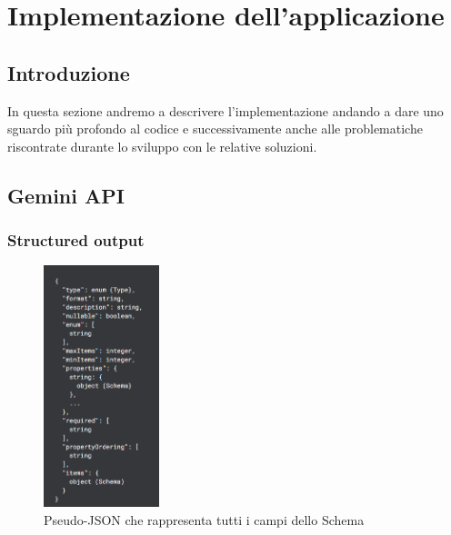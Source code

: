 \chapter{Implementazione dell'applicazione}
\pagestyle{plain}


\section{Introduzione}
In questa sezione andremo a descrivere l'implementazione andando a dare uno sguardo più profondo al codice e successivamente anche alle problematiche riscontrate durante lo sviluppo con le relative soluzioni.


\section{Gemini API}
\subsection{Structured output}

\begin{figure} %
    \centering
    \includegraphics[width=0.30\textwidth]{figures/chapter_1/geminiPseudoSchema.png}
    \caption{Pseudo-JSON che rappresenta tutti i campi dello Schema}
\end{figure}

